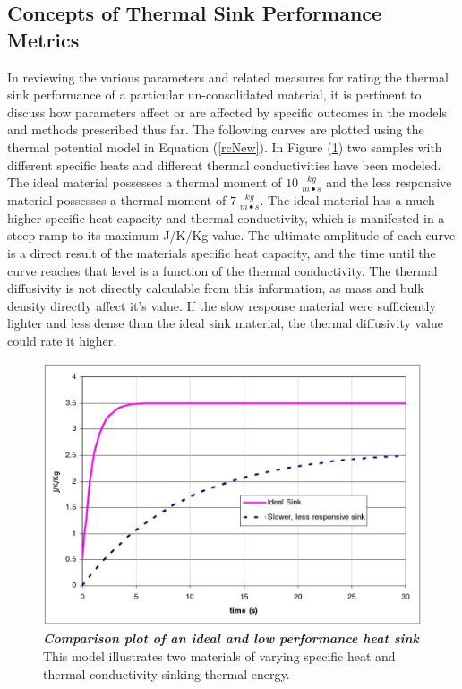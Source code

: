 \subsection{Concepts of Thermal Sink Performance Metrics}

In reviewing the various parameters and related measures for rating the thermal sink performance of a particular un-consolidated material, it is pertinent to discuss how parameters affect or are affected by specific outcomes in the models and methods prescribed thus far. The following curves are plotted using the thermal potential model in Equation (\ref{rcNew}). In Figure (\ref{sinkComp1}) two samples with different specific heats and different thermal conductivities have been modeled. The ideal material possesses a thermal moment of $10\:\frac{kg}{m\bullet s}$ and the less responsive material possesses a thermal moment of $7\:\frac{kg}{m\bullet s}$. The ideal material has a much higher specific heat capacity and thermal conductivity, which is manifested in a steep ramp to its maximum J/K/Kg value. The ultimate amplitude of each curve is a direct result of the materials specific heat capacity, and the time until the curve reaches that level is a function of the thermal conductivity. The thermal diffusivity is not directly calculable from this information, as mass and bulk density directly affect it's value. If the slow response material were sufficiently lighter and less dense than the ideal sink material, the thermal diffusivity value could rate it higher.

\begin{figure}
 \centering\includegraphics[scale=0.5]{sinkComp1.jpg}
 \caption[Theoretical Heat Sink Performances]{\textbf{\emph{Comparison plot of an ideal and low performance heat sink}} This model illustrates two materials of varying specific heat and thermal conductivity sinking thermal energy.\label{sinkComp1}}
\end{figure}

